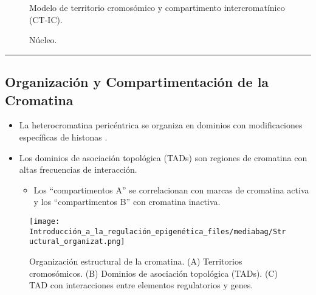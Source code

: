 \documentclass[
  letterpaper,
  DIV=11,
  numbers=noendperiod]{scrartcl}
\providecommand{\tightlist}{%
  \setlength{\itemsep}{0pt}\setlength{\parskip}{0pt}}\usepackage{longtable,booktabs,array}
\begin{document}
\begin{figure}[H]

{\centering 

}

\caption{Modelo de territorio cromosómico y compartimento
intercromatínico (CT-IC).}

\end{figure}%
\begin{figure}[H]

{\centering 

}

\caption{Núcleo.}

\end{figure}%

\begin{center}\rule{0.5\linewidth}{0.5pt}\end{center}

\subsection{Organización y Compartimentación de la
Cromatina}\label{organizaciuxf3n-y-compartimentaciuxf3n-de-la-cromatina-2}

\begin{itemize}
\tightlist
\item
  La heterocromatina pericéntrica se organiza en dominios con
  modificaciones específicas de histonas .
\item
  Los dominios de asociación topológica (TADs) son regiones de cromatina
  con altas frecuencias de interacción.

  \begin{itemize}
  \tightlist
  \item
    Los ``compartimentos A'' se correlacionan con marcas de cromatina
    activa y los ``compartimentos B'' con cromatina inactiva.
  \end{itemize}
\end{itemize}

\begin{figure}[H]

{\centering \texttt{[image: Introducción\_a\_la\_regulación\_epigenética\_files/mediabag/Structural\_organizat.png]}

}

\caption{Organización estructural de la cromatina. (A) Territorios
cromosómicos. (B) Dominios de asociación topológica (TADs). (C) TAD con
interacciones entre elementos regulatorios y genes.}

\end{figure}%
\end{document}

